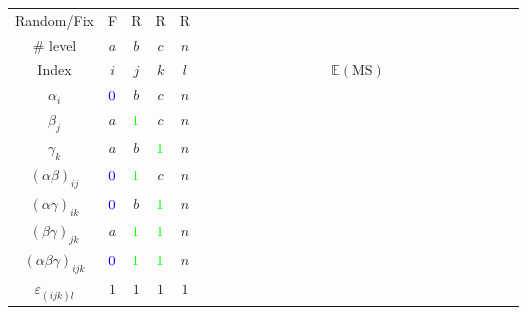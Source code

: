\begin{enumerate}[topsep=2pt,itemsep=2pt]
    \begin{table}[H]
        \centering
        \renewcommand\arraystretch{1}
        \begin{tabular}{cccccc}
            \hline
            \hline
            Random/Fix                      &{\color{blue}F  }    &{\color{green}R}      &{\color{green}R}      &R      &$ \qquad\qquad\qquad\qquad\qquad\qquad\qquad\qquad\qquad\qquad\qquad$\\
            \# level                        &$ a $  &$ b $  &$ c $  &$ n $  &\\
            Index                           &$ i $  &$ j $  &$ k $  &$ l $  &$ \mathbb{E}\left( \mathrm{MS}  \right)  $\\
            \hline
            $ \alpha _i $                   &$ \color{blue}0 $  &$ b $  &$ c $  &$ n $  &\\
            $ \beta _j $                    &$ a $  &$ \color{green}1 $  &$ c $  &$ n $  &\\
            $ \gamma _k $                   &$ a $  &$ b $  &$ \color{green}1 $  &$ n $  &\\
            $ (\alpha \beta )_{ij} $        &$ \color{blue}0 $  &$ \color{green}1 $  &$ c $  &$ n $  &\\
            $ (\alpha \gamma )_{ik} $       &$ \color{blue}0 $  &$ b $  &$ \color{green}1 $  &$ n $  &\\
            $ (\beta \gamma )_{jk} $        &$ a $  &$ \color{green}1 $  &$ \color{green}1 $  &$ n $  &\\
            $ (\alpha \beta \gamma )_{ijk} $&$ \color{blue}0 $  &$ \color{green}1 $  &$ \color{green}1 $  &$ n $  &\\
            $ \varepsilon _{(ijk)l} $       &$ 1 $  &$ 1 $  &$ 1 $  &$ 1 $  &\\
            \hline
            \hline
        \end{tabular}
        \label{}
    \end{table}



\end{enumerate}

